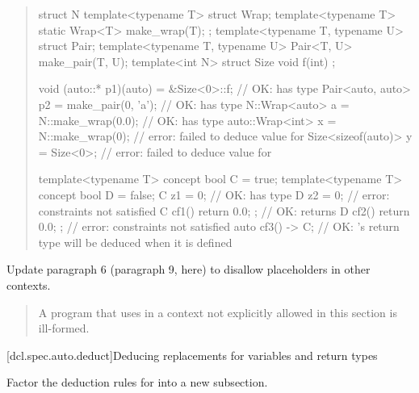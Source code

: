 \begin{quote}
\begin{addedblock}
\begin{codeblock}
struct N {
  template<typename T> struct Wrap;
  template<typename T> static Wrap<T> make_wrap(T);
};
template<typename T, typename U> struct Pair;
template<typename T, typename U> Pair<T, U> make_pair(T, U);
template<int N> struct Size { void f(int) { }  };

void (auto::* p1)(auto) = &Size<0>::f;   // OK:  has type 
Pair<auto, auto> p2 = make_pair(0, 'a'); // OK:  has type 
N::Wrap<auto> a = N::make_wrap(0.0);     // OK:  has type 
auto::Wrap<int> x = N::make_wrap(0);     // error: failed to deduce value for 
Size<sizeof(auto)> y = Size<0>{};        // error: failed to deduce value for 

template<typename T> concept bool C = true;
template<typename T> concept bool D = false;
C z1 = 0;                // OK:  has type 
D z2 = 0;                // error: constraints not satisfied
C cf1() { return 0.0; }; // OK:  returns 
D cf2() { return 0.0; }; // error: constraints not satisfied
auto cf3() -> C;         // OK: 's return type will be deduced when it is defined
\end{codeblock}
\end{addedblock}
\end{quote}

Update paragraph 6 (paragraph 9, here) to disallow placeholders in
other contexts.

\begin{quote}
\pnum
A program that uses 
 in a context not explicitly allowed in this section is 
ill-formed.
\end{quote}


% 
% 
[dcl.spec.auto.deduct]{Deducing replacements for variables and return types}

Factor the deduction rules for  into a new subsection.

